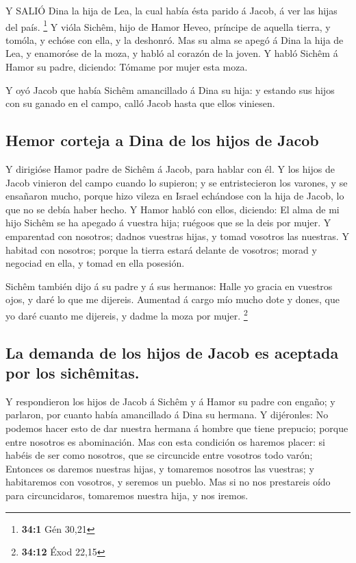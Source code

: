  Y SALIÓ Dina la hija de Lea, la cual había ésta parido á
Jacob, á ver las hijas del país. \footnote{\textbf{34:1} Gén 30,21}
 Y vióla Sichêm, hijo de Hamor Heveo, príncipe de aquella
tierra, y tomóla, y echóse con ella, y la deshonró.  Mas su
alma se apegó á Dina la hija de Lea, y enamoróse de la moza, y habló al
corazón de la joven.  Y habló Sichêm á Hamor su padre,
diciendo: Tómame por mujer esta moza.

 Y oyó Jacob que había Sichêm amancillado á Dina su hija: y
estando sus hijos con su ganado en el campo, calló Jacob hasta que ellos
viniesen.

\hypertarget{hemor-corteja-a-dina-de-los-hijos-de-jacob}{%
\subsection{Hemor corteja a Dina de los hijos de
Jacob}\label{hemor-corteja-a-dina-de-los-hijos-de-jacob}}

 Y dirigióse Hamor padre de Sichêm á Jacob, para hablar con
él.  Y los hijos de Jacob vinieron del campo cuando lo
supieron; y se entristecieron los varones, y se ensañaron mucho, porque
hizo vileza en Israel echándose con la hija de Jacob, lo que no se debía
haber hecho.  Y Hamor habló con ellos, diciendo: El alma de
mi hijo Sichêm se ha apegado á vuestra hija; ruégoos que se la deis por
mujer.  Y emparentad con nosotros; dadnos vuestras hijas, y
tomad vosotros las nuestras.  Y habitad con nosotros;
porque la tierra estará delante de vosotros; morad y negociad en ella, y
tomad en ella posesión.

 Sichêm también dijo á su padre y á sus hermanos: Halle yo
gracia en vuestros ojos, y daré lo que me dijereis. 
Aumentad á cargo mío mucho dote y dones, que yo daré cuanto me dijereis,
y dadme la moza por mujer. \footnote{\textbf{34:12} Éxod 22,15}

\hypertarget{la-demanda-de-los-hijos-de-jacob-es-aceptada-por-los-sichuxeamitas.}{%
\subsection{La demanda de los hijos de Jacob es aceptada por los
sichêmitas.}\label{la-demanda-de-los-hijos-de-jacob-es-aceptada-por-los-sichuxeamitas.}}

 Y respondieron los hijos de Jacob á Sichêm y á Hamor su
padre con engaño; y parlaron, por cuanto había amancillado á Dina su
hermana.  Y dijéronles: No podemos hacer esto de dar
nuestra hermana á hombre que tiene prepucio; porque entre nosotros es
abominación.  Mas con esta condición os haremos placer: si
habéis de ser como nosotros, que se circuncide entre vosotros todo
varón;  Entonces os daremos nuestras hijas, y tomaremos
nosotros las vuestras; y habitaremos con vosotros, y seremos un pueblo.
 Mas si no nos prestareis oído para circuncidaros,
tomaremos nuestra hija, y nos iremos.

